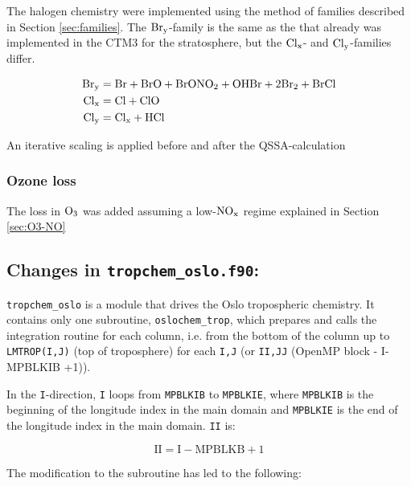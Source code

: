 The halogen chemistry were implemented using the method of families described in Section \ref{sec:families}. The $\mathrm{Br_y}$-family is the same as the that already was implemented in the CTM3 for the stratosphere, but the $\mathrm{Cl_x}$- and $\mathrm{Cl_y}$-families differ. 
 
\begin{align*}
    \mathrm{Br_y} &= \mathrm{Br} + \mathrm{BrO} + \mathrm{BrONO_2} + \mathrm{OHBr} + 2\mathrm{Br_2} + \mathrm{BrCl} \\
    \mathrm{Cl_x} &= \mathrm{Cl} + \mathrm{ClO} \\
    \mathrm{Cl_y} &= \mathrm{Cl_x} + \mathrm{HCl}
\end{align*}

An iterative scaling is applied before and after the QSSA-calculation



\subsubsection{Ozone loss}


The loss in $\mathrm{O_3}$ was added assuming a low-$\mathrm{NO_x}$ regime explained in Section \ref{sec:O3-NO}

\subsection{Changes in \texttt{tropchem\_oslo.f90}:}\label{sec:tropchem_oslo}

\texttt{tropchem\_oslo} is a module that drives the Oslo tropospheric chemistry. It contains only one subroutine, \texttt{oslochem\_trop}, which prepares and calls the integration routine for each column, i.e. from the bottom of the column up to \texttt{LMTROP(I,J)} (top of troposphere) for each \texttt{I,J} (or \texttt{II,JJ} (OpenMP block - I-MPBLKIB +1)). 

\medskip

In the \texttt{I}-direction, \texttt{I} loops from \texttt{MPBLKIB} to \texttt{MPBLKIE}, where \texttt{MPBLKIB} is the beginning of the longitude index in the main domain and \texttt{MPBLKIE} is the end of the longitude index in the main domain. \texttt{II} is: 

\begin{equation*}
    \text{II} = \text{I} - \text{MPBLKB} + 1
\end{equation*}

\medskip

The modification to the subroutine has led to the following: 


